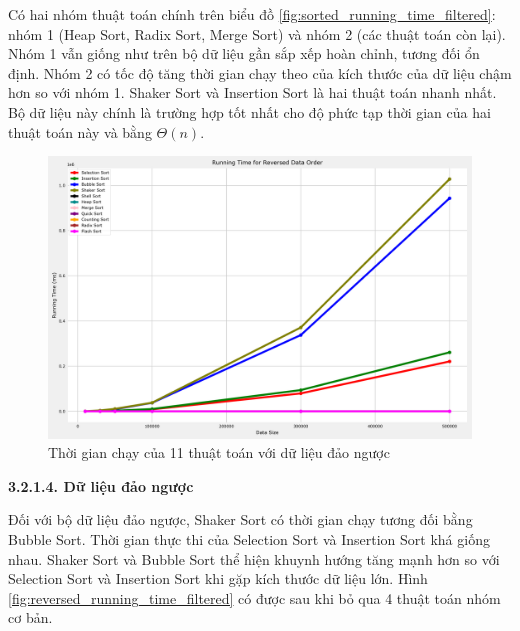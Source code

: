Có hai nhóm thuật toán chính trên biểu đồ \ref{fig:sorted_running_time_filtered}: nhóm 1 (Heap Sort, Radix Sort, Merge Sort) và nhóm 2 (các thuật toán còn lại). Nhóm 1 vẫn giống như trên bộ dữ liệu gần sắp xếp hoàn chỉnh, tương đối ổn định. Nhóm 2 có tốc độ tăng thời gian chạy theo của kích thước của dữ liệu chậm hơn so với nhóm 1. Shaker Sort và Insertion Sort là hai thuật toán nhanh nhất. Bộ dữ liệu này chính là trường hợp tốt nhất cho độ phức tạp thời gian của hai thuật toán này và bằng $\Theta(n)$.


\begin{figure}[H]
    \centering
    \includegraphics[width=\textwidth]{experimental_result/images/reversed_running_time.png}
    \caption{Thời gian chạy của 11 thuật toán với dữ liệu đảo ngược}
    \label{fig:reversed_running_time}
\end{figure}

\textbf{3.2.1.4. Dữ liệu đảo ngược}


Đối với bộ dữ liệu đảo ngược, Shaker Sort có thời gian chạy tương đối bằng Bubble Sort. Thời gian thực thi của Selection Sort và Insertion Sort khá giống nhau. Shaker Sort và Bubble Sort thể hiện khuynh hướng tăng mạnh hơn so với Selection Sort và Insertion Sort khi gặp kích thước dữ liệu lớn. Hình \ref{fig:reversed_running_time_filtered} có được sau khi bỏ qua 4 thuật toán nhóm cơ bản.


